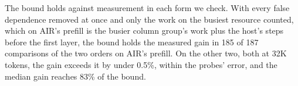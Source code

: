 The bound holds against measurement in each form we check.
With every false dependence removed at once and only the work on the busiest resource counted, which on AIR's prefill is the busier column group's work plus the host's steps before the first layer, the bound holds the measured gain in 185 of 187 comparisons of the two orders on AIR's prefill.
On the other two, both at 32K tokens, the gain exceeds it by under 0.5\%, within the probes' error, and the median gain reaches 83\% of the bound.

